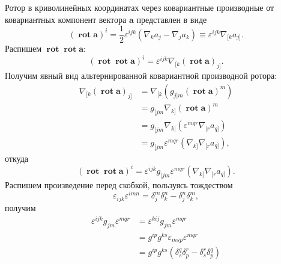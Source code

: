 \documentclass[12pt,a4paper]{article}
\DeclareMathOperator{\Rot}{\mathbf{rot}}
\newcommand{\V}[1]{\mathbf{#1}}
\begin{document}
        Ротор в криволинейных координатах через ковариантные производные от ковариантных компонент вектора $\V{a}$ представлен в виде
        \begin{equation}
            \left( \Rot\V{a} \right)^i
                = \frac{1}{2} \varepsilon^{ijk} \left(
                    \nabla_k a_j - \nabla_j a_k
                \right)
                \equiv \varepsilon^{ijk} \nabla_{[k} a_{j]}.
        \end{equation}
        Распишем $\Rot\Rot\V{a}$:
        \begin{equation}
            \left( \Rot\Rot\V{a} \right)^i
                = \varepsilon^{ijk} \nabla_{[k} \left( \Rot\V{a} \right)_{j]}.
        \end{equation}
        Получим явный вид альтернированной ковариантной производной ротора:
        \begin{equation}\begin{aligned}
            \nabla_{[k} \left( \Rot\V{a} \right)_{j]}
                &= \nabla_{[k} \left( g_{j]m} \left( \Rot\V{a} \right)^m \right) \\
                &= g_{[jm} \nabla_{k]} \left( \Rot\V{a} \right)^m \\
                &= g_{[jm} \nabla_{k]} \left(
                       \varepsilon^{mqr} \nabla_{[r} a_{q]}
                \right) \\
                &= g_{[jm} \varepsilon^{mqr} \left(
                   \nabla_{k]} \nabla_{[r} a_{q]}
                \right),
        \end{aligned}\end{equation}
        откуда
        \begin{equation}
            \left( \Rot\Rot\V{a} \right)^i
                = \varepsilon^{ijk} g_{[jm} \varepsilon^{mqr} \left(
                    \nabla_{k]} \nabla_{[r} a_{q]}
                \right).
        \end{equation}
        Распишем произведение перед скобкой, пользуясь тождеством
        \begin{equation}
           \varepsilon_{ijk} \varepsilon^{imn} = \delta_j^m \delta_k^n - \delta_j^n \delta_k^m,
        \end{equation}
        получим
        \begin{equation}\begin{aligned}
           \varepsilon^{ijk} g_{jm} \varepsilon^{mqr}
                &= \varepsilon^{kij} g_{jm} \varepsilon^{mqr} \\
                &= g^{ip} g^{ks} \varepsilon_{msp} \varepsilon^{mqr} \\
                &= g^{ip} g^{ks} \left(
                    \delta_s^q \delta_p^r - \delta_s^r \delta_p^q
                \right)
        \end{aligned}\end{equation}
\end{document}
